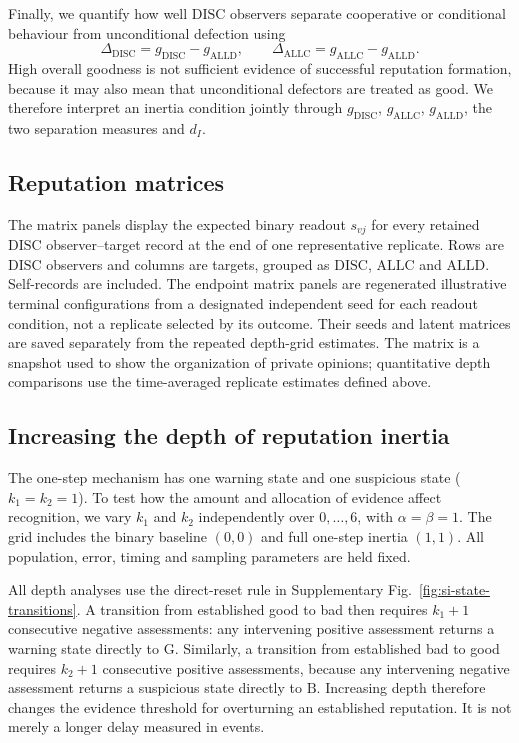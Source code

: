 \documentclass[fleqn,10pt]{wlscirep}
\begin{document}
Finally, we quantify how well $\mathrm{DISC}$ observers separate cooperative or conditional behaviour from unconditional defection using
\begin{equation}
\Delta_{\mathrm{DISC}}=g_{\mathrm{DISC}}-g_{\mathrm{ALLD}},
\qquad
\Delta_{\mathrm{ALLC}}=g_{\mathrm{ALLC}}-g_{\mathrm{ALLD}}.
\label{eq:si-finite-separation}
\end{equation}
High overall goodness is not sufficient evidence of successful reputation formation, because it may also mean that unconditional defectors are treated as good. We therefore interpret an inertia condition jointly through $g_{\mathrm{DISC}}$, $g_{\mathrm{ALLC}}$, $g_{\mathrm{ALLD}}$, the two separation measures and $d_I$.

\subsection{Reputation matrices}

The matrix panels display the expected binary readout $s_{vj}$ for every retained $\mathrm{DISC}$ observer--target record at the end of one representative replicate. Rows are $\mathrm{DISC}$ observers and columns are targets, grouped as $\mathrm{DISC}$, $\mathrm{ALLC}$ and $\mathrm{ALLD}$. Self-records are included. The endpoint matrix panels are regenerated illustrative terminal configurations from a designated independent seed for each readout condition, not a replicate selected by its outcome. Their seeds and latent matrices are saved separately from the repeated depth-grid estimates. The matrix is a snapshot used to show the organization of private opinions; quantitative depth comparisons use the time-averaged replicate estimates defined above.

\subsection{Increasing the depth of reputation inertia}
\label{sec:si-depth-scan}

The one-step mechanism has one warning state and one suspicious state ($k_1=k_2=1$). To test how the amount and allocation of evidence affect recognition, we vary $k_1$ and $k_2$ independently over $0,\ldots,6$, with $\alpha=\beta=1$. The grid includes the binary baseline $(0,0)$ and full one-step inertia $(1,1)$. All population, error, timing and sampling parameters are held fixed.

All depth analyses use the direct-reset rule in Supplementary Fig.~\ref{fig:si-state-transitions}. A transition from established good to bad then requires $k_1+1$ consecutive negative assessments: any intervening positive assessment returns a warning state directly to $\mathrm G$. Similarly, a transition from established bad to good requires $k_2+1$ consecutive positive assessments, because any intervening negative assessment returns a suspicious state directly to $\mathrm B$. Increasing depth therefore changes the evidence threshold for overturning an established reputation. It is not merely a longer delay measured in events.
\end{document}
